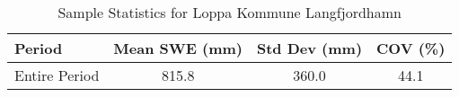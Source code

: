 
    \begin{table}[h!]
        \centering
        \caption{Sample Statistics for Loppa Kommune Langfjordhamn}
        \begin{tabular}{lccc} 
            \toprule
            \textbf{Period} & \textbf{Mean SWE (mm)} & \textbf{Std Dev (mm)} & \textbf{COV (\%)} \\
            \midrule
            Entire Period & 815.8 & 360.0 & 44.1 \\
            \bottomrule
        \end{tabular}
        \label{tab:sample_stats_Loppa Kommune Langfjordhamn}
    \end{table}
    